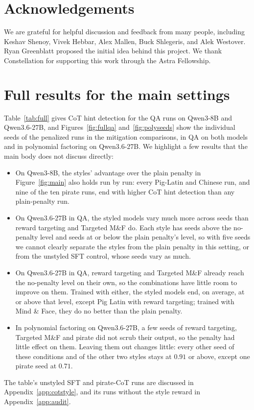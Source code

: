 \documentclass{article}
\begin{document}
\section*{Acknowledgements}
We are grateful for helpful discussion and feedback from many people, including Keshav Shenoy, Vivek Hebbar, Alex Mallen, Buck Shlegeris, and Alek Westover. Ryan Greenblatt proposed the initial idea behind this project. We thank Constellation for supporting this work through the Astra Fellowship.




\appendix

\section{Full results for the main settings}
\label{app:full}\label{app:envs}

Table~\ref{tab:full} gives CoT hint detection for the QA runs on Qwen3-8B and Qwen3.6-27B, and Figures~\ref{fig:fullqa} and~\ref{fig:polyseeds} show the individual seeds of the penalized runs in the mitigation comparisons, in QA on both models and in polynomial factoring on Qwen3.6-27B. We highlight a few results that the main body does not discuss directly:
\begin{itemize}
\item On Qwen3-8B, the styles' advantage over the plain penalty in Figure~\ref{fig:main} also holds run by run: every Pig-Latin and Chinese run, and nine of the ten pirate runs, end with higher CoT hint detection than any plain-penalty run.
\item On Qwen3.6-27B in QA, the styled models vary much more across seeds than reward targeting and Targeted M\&F do. Each style has seeds above the no-penalty level and seeds at or below the plain penalty's level, so with five seeds we cannot clearly separate the styles from the plain penalty in this setting, or from the unstyled SFT control, whose seeds vary as much.
\item On Qwen3.6-27B in QA, reward targeting and Targeted M\&F already reach the no-penalty level on their own, so the combinations have little room to improve on them. Trained with either, the styled models end, on average, at or above that level, except Pig Latin with reward targeting; trained with Mind \& Face, they do no better than the plain penalty.
\item In polynomial factoring on Qwen3.6-27B, a few seeds of reward targeting, Targeted M\&F and pirate did not scrub their output, so the penalty had little effect on them. Leaving them out changes little: every other seed of these conditions and of the other two styles stays at $0.91$ or above, except one pirate seed at $0.71$.
\end{itemize}
The table's unstyled SFT and pirate-CoT runs are discussed in Appendix~\ref{app:cotstyle}, and its runs without the style reward in Appendix~\ref{app:audit}.
\end{document}
